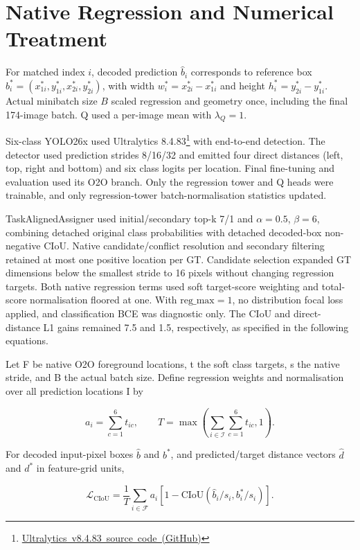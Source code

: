 \section{Native Regression and Numerical Treatment}
\label{app:native-regression}

For matched index $i$, decoded prediction $\hat b_i$ corresponds to reference box $b_i^*=(x_{1i}^*,y_{1i}^*,x_{2i}^*,y_{2i}^*)$, with width $w_i^*=x_{2i}^*-x_{1i}^*$ and height $h_i^*=y_{2i}^*-y_{1i}^*$. Actual minibatch size $B$ scaled regression and geometry once, including the final 174-image batch. Q used a per-image mean with $\lambda_Q=1$.



Six-class YOLO26x used Ultralytics 8.4.83\footnote{\mbox{\href{https://github.com/ultralytics/ultralytics/tree/v8.4.83}{Ultralytics v8.4.83 source code (GitHub)}}} with end-to-end detection. The detector used prediction strides 8/16/32 and emitted four direct distances (left, top, right and bottom) and six class logits per location. Final fine-tuning and evaluation used its O2O branch. Only the regression tower and Q heads were trainable, and only regression-tower batch-normalisation statistics updated.

TaskAlignedAssigner used initial/secondary top-k 7/1 and $\alpha=0.5$, $\beta=6$, combining detached original class probabilities with detached decoded-box non-negative CIoU. Native candidate/conflict resolution and secondary filtering retained at most one positive location per GT. Candidate selection expanded GT dimensions below the smallest stride to 16 pixels without changing regression targets. Both native regression terms used soft target-score weighting and total-score normalisation floored at one. With $\mathrm{reg\_max}=1$, no distribution focal loss applied, and classification BCE was diagnostic only. The CIoU and direct-distance L1 gains remained 7.5 and 1.5, respectively, as specified in the following equations.

Let F be native O2O foreground locations, t the soft class targets, s the native stride, and B the actual batch size. Define regression weights and normalisation over all prediction locations I by

\[
a_i=\sum_{c=1}^{6}t_{ic},
\qquad
T=\max\left(\sum_{i\in\mathcal I}\sum_{c=1}^{6}t_{ic},1\right).
\]

For decoded input-pixel boxes \(\hat b\) and \(b^*\), and predicted/target distance vectors \(\hat d\) and \(d^*\) in feature-grid units,

\[
\mathcal L_{\mathrm{CIoU}}
=\frac{1}{T}\sum_{i\in\mathcal F}
a_i\left[1-\mathrm{CIoU}\left(\hat b_i/s_i,b_i^*/s_i\right)\right].
\]


